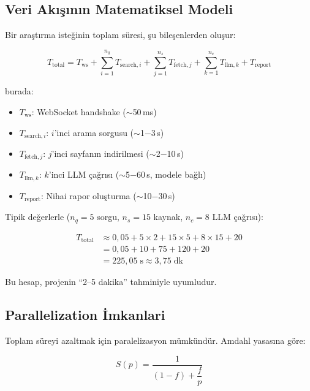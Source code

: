 \subsection{Veri Ak{\i}\c{s}{\i}n{\i}n Matematiksel Modeli}

Bir ara\c{s}t{\i}rma iste\u{g}inin toplam s\"{u}resi, \c{s}u bile\c{s}enlerden olu\c{s}ur:

\begin{equation}
\label{eq:total-latency}
T_{\text{total}} = T_{\text{ws}} + \sum_{i=1}^{n_q} T_{\text{search},i} + \sum_{j=1}^{n_s} T_{\text{fetch},j} + \sum_{k=1}^{n_c} T_{\text{llm},k} + T_{\text{report}}
\end{equation}

\noindent burada:
\begin{itemize}
  \item $T_{\text{ws}}$: WebSocket handshake ($\sim$50\,ms)
  \item $T_{\text{search},i}$: $i$'inci arama sorgusu ($\sim$1$-$3\,s)
  \item $T_{\text{fetch},j}$: $j$'inci sayfan{\i}n indirilmesi ($\sim$2$-$10\,s)
  \item $T_{\text{llm},k}$: $k$'inci LLM \c{c}a\u{g}r{\i}s{\i} ($\sim$5$-$60\,s, modele ba\u{g}l{\i})
  \item $T_{\text{report}}$: Nihai rapor olu\c{s}turma ($\sim$10$-$30\,s)
\end{itemize}

Tipik de\u{g}erlerle ($n_q = 5$ sorgu, $n_s = 15$ kaynak, $n_c = 8$ LLM \c{c}a\u{g}r{\i}s{\i}):

\begin{align}
T_{\text{total}} &\approx 0{,}05 + 5 \times 2 + 15 \times 5 + 8 \times 15 + 20 \nonumber \\
&= 0{,}05 + 10 + 75 + 120 + 20 \nonumber \\
&= 225{,}05\;\text{s} \approx 3{,}75\;\text{dk}
\end{align}

Bu hesap, projenin ``2--5 dakika'' tahminiyle uyumludur.

\subsection{Parallelization \.{I}mkanlari}

Toplam s\"{u}reyi azaltmak i\c{c}in paralelizasyon m\"{u}mk\"{u}nd\"{u}r. Amdahl yasas{\i}na g\"{o}re:

\begin{equation}
\label{eq:deploy-amdahl}
S(p) = \frac{1}{(1 - f) + \dfrac{f}{p}}
\end{equation}

